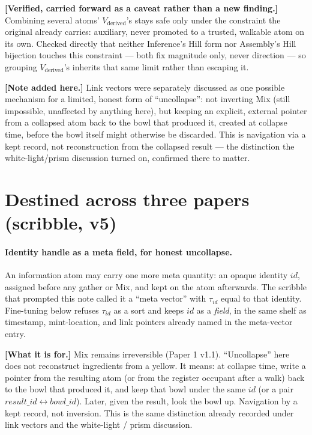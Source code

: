 \documentclass[11pt]{article}
\begin{document}
\textbf{[Verified, carried forward as a caveat rather than a new
finding.]} Combining several atoms' $V_{\text{derived}}$'s stays safe
only under the constraint the original already carries: auxiliary,
never promoted to a trusted, walkable atom on its own. Checked
directly that neither Inference's Hill form nor Assembly's Hill
bijection touches this constraint --- both fix magnitude only, never
direction --- so grouping $V_{\text{derived}}$'s inherits that same
limit rather than escaping it.

\textbf{[Note added here.]} Link vectors were separately discussed as
one possible mechanism for a limited, honest form of ``uncollapse'':
not inverting Mix (still impossible, unaffected by anything here),
but keeping an explicit, external pointer from a collapsed atom back
to the bowl that produced it, created at collapse time, before the
bowl itself might otherwise be discarded. This is navigation via a
kept record, not reconstruction from the collapsed result --- the
distinction the white-light/prism discussion turned on, confirmed
there to matter.

\section{Destined across three papers (scribble, v5)}

\paragraph{Identity handle as a meta field, for honest uncollapse.}
An information atom may carry one more meta quantity: an opaque
identity $id$, assigned before any gather or Mix, and kept on the
atom afterwards. The scribble that prompted this note called it a
``meta vector'' with $\tau_{id}$ equal to that identity. Fine-tuning
below refuses $\tau_{id}$ as a sort and keeps $id$ as a \emph{field},
in the same shelf as timestamp, mint-location, and link pointers
already named in the meta-vector entry.

\textbf{[What it is for.]} Mix remains irreversible (Paper 1 v1.1).
``Uncollapse'' here does not reconstruct ingredients from a yellow.
It means: at collapse time, write a pointer from the resulting atom
(or from the register occupant after a walk) back to the bowl that
produced it, and keep that bowl under the same $id$ (or a pair
$result\_id \leftrightarrow bowl\_id$). Later, given the result, look
the bowl up. Navigation by a kept record, not inversion. This is the
same distinction already recorded under link vectors and the
white-light / prism discussion.
\end{document}
